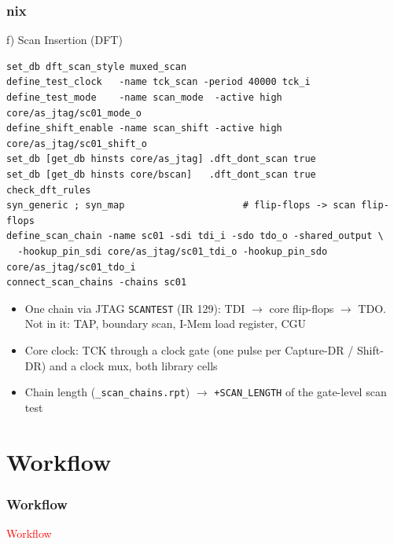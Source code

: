 \documentclass{beamer}
\newcommand{\astitle}{nix}
\newcommand{\assubtitle}{nix}
\newcommand{\cmd}[1]{\texttt{#1}}
\begin{document}
\renewcommand{\assubtitle}{f) Scan Insertion (DFT)}
\begin{frame}[fragile]
\frametitle{\astitle}
\begin{block}{\assubtitle}
\begin{lstlisting}[style=sh,basicstyle=\ttfamily\tiny]
set_db dft_scan_style muxed_scan
define_test_clock   -name tck_scan -period 40000 tck_i
define_test_mode    -name scan_mode  -active high core/as_jtag/sc01_mode_o
define_shift_enable -name scan_shift -active high core/as_jtag/sc01_shift_o
set_db [get_db hinsts core/as_jtag] .dft_dont_scan true
set_db [get_db hinsts core/bscan]   .dft_dont_scan true
check_dft_rules
syn_generic ; syn_map                     # flip-flops -> scan flip-flops
define_scan_chain -name sc01 -sdi tdi_i -sdo tdo_o -shared_output \
  -hookup_pin_sdi core/as_jtag/sc01_tdi_o -hookup_pin_sdo core/as_jtag/sc01_tdo_i
connect_scan_chains -chains sc01
\end{lstlisting}
  \scriptsize
  \begin{itemize}
    \item One chain via JTAG \cmd{SCANTEST} (IR 129): TDI $\rightarrow$ core
      flip-flops $\rightarrow$ TDO. Not in it: TAP, boundary scan, I-Mem load
      register, CGU
    \item Core clock: TCK through a clock gate (one pulse per Capture-DR /
      Shift-DR) and a clock mux, both library cells
    \item Chain length (\cmd{\_scan\_chains.rpt}) $\rightarrow$
      \cmd{+SCAN\_LENGTH} of the gate-level scan test
  \end{itemize}
\end{block}
\end{frame}

\section{Workflow}
\renewcommand{\astitle}{Workflow}
\begin{frame}
\frametitle{\astitle}
\textcolor{red}{Workflow}
\end{frame}
\end{document}

